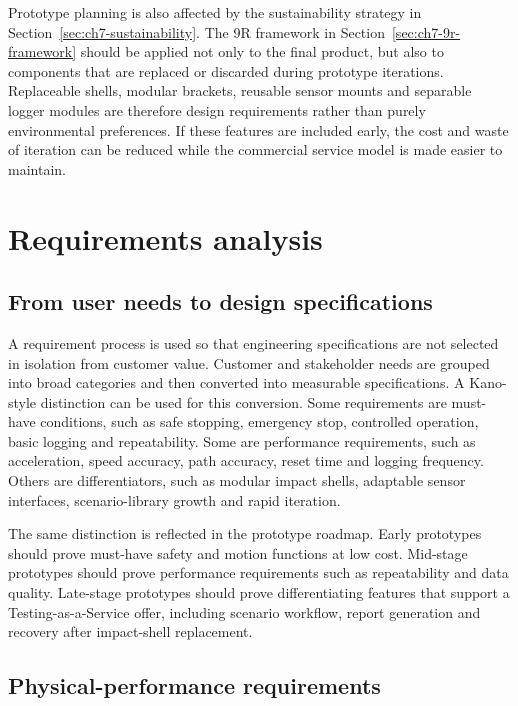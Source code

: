 Prototype planning is also affected by the sustainability strategy in Section~\ref{sec:ch7-sustainability}. The 9R framework in Section~\ref{sec:ch7-9r-framework} should be applied not only to the final product, but also to components that are replaced or discarded during prototype iterations. Replaceable shells, modular brackets, reusable sensor mounts and separable logger modules are therefore design requirements rather than purely environmental preferences. If these features are included early, the cost and waste of iteration can be reduced while the commercial service model is made easier to maintain.

\section{Requirements analysis}
\label{sec:ch8_requirements_analysis}

\subsection{From user needs to design specifications}
\label{sec:ch8_user_needs_to_specs}

A requirement process is used so that engineering specifications are not selected in isolation from customer value. Customer and stakeholder needs are grouped into broad categories and then converted into measurable specifications. A Kano-style distinction can be used for this conversion. Some requirements are must-have conditions, such as safe stopping, emergency stop, controlled operation, basic logging and repeatability. Some are performance requirements, such as acceleration, speed accuracy, path accuracy, reset time and logging frequency. Others are differentiators, such as modular impact shells, adaptable sensor interfaces, scenario-library growth and rapid iteration.

The same distinction is reflected in the prototype roadmap. Early prototypes should prove must-have safety and motion functions at low cost. Mid-stage prototypes should prove performance requirements such as repeatability and data quality. Late-stage prototypes should prove differentiating features that support a Testing-as-a-Service offer, including scenario workflow, report generation and recovery after impact-shell replacement.

\subsection{Physical-performance requirements}
\label{sec:ch8_physical_performance_requirements}

